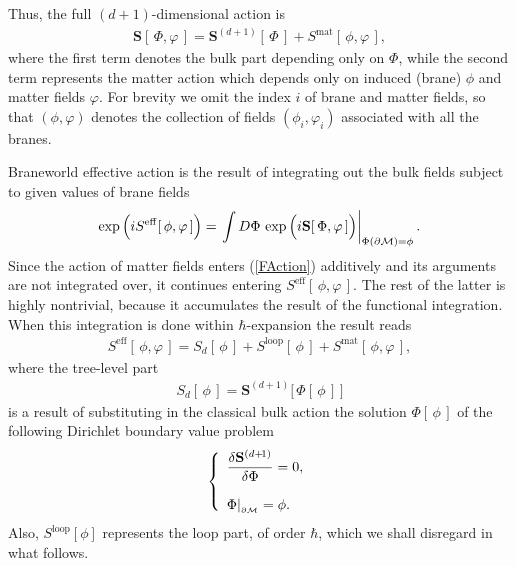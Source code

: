 \documentclass[a4paper,12pt]{article}
\newcommand{\DDim}{{(d+\!1)}}
\newcommand{\dM}{{\partial \cal M}}
\begin{document}
Thus, the full $(d+1)$-dimensional action is
    \begin{eqnarray}
     \mathbf{S}[\,\Phi,\varphi\,]=
     \mathbf{S}^{\DDim}[\,{\Phi}\,]
     +S^{\mathrm{mat}}[\,\phi,\varphi\,],       \label{FAction}
    \end{eqnarray}
where the first term denotes the bulk part depending only on
$\Phi$, while the second term represents the matter action which
depends only on induced (brane) $\phi$ and matter fields
$\varphi$. For brevity we omit the index $i$ of brane and matter
fields, so that $(\phi,\varphi)$ denotes the collection of fields
$(\phi_i,\varphi_i)$ associated with all the branes.

Braneworld effective action is the result of integrating out the
bulk fields subject to given values of brane fields
    \begin{eqnarray}
    \exp\Big(iS^{\mathrm{eff}}[\,\phi,\varphi\,]\Big)
    =\left.\int D\Phi\,
    \exp\Big(i\mathbf{S}[\,\Phi,\varphi\,]\Big)
    \right|_{\Phi(\dM)=\phi}.                 \label{BdefBWEA}
    \end{eqnarray}
Since the action of matter fields enters (\ref{FAction})
additively and its arguments are not integrated over, it continues
entering $S^{\mathrm{eff}}[\,\phi,\varphi\,]$. The rest of the
latter is highly nontrivial, because it accumulates the result of
the functional integration. When this integration is done within
$\hbar$-expansion the result reads
    \begin{eqnarray}
     S^{\mathrm{eff}}[\,\phi,\varphi\,]
     =S_d[\,\phi\,]
     +S^{\mathrm{loop}}[\,\phi\,]
     +S^{\mathrm{mat}}[\,\phi,\varphi\,],  \label{DefBWEALoopExp}
    \end{eqnarray}
where the tree-level part
    \begin{eqnarray}
     S_d[\,\phi\,]=
     \mathbf{S}^{\DDim}\big[\,\Phi[\,\phi\,]\,\big]     \label{S}
    \end{eqnarray}
is a result of substituting in the classical bulk action the
solution $\Phi[\,\phi\,]$ of the following  Dirichlet boundary
value problem
    \begin{eqnarray}
    \left\{ \begin{array}{l}
    \displaystyle{\frac{\delta\mathbf{S}^{\DDim}}
    {\delta \Phi}}=0,  \\
    \\
    \Phi|_{_{\dM}}=\phi.
     \end{array} \right.                        \label{F(f)}
    \end{eqnarray}
Also, $S^{\mathrm{loop}}[\phi]$ represents the loop part, of order
$\hbar$, which we shall disregard in what follows.
\end{document}

